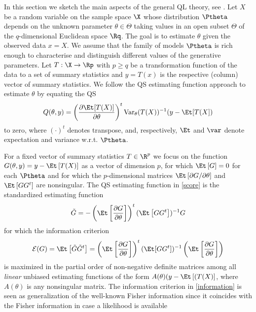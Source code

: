 In this section we sketch the main aspects of the general QL theory, see
\cite{ref:Heyde1997}. Let $X$ be a random variable on the sample space $\X$ whose
distribution $\Ptheta$ depends on the unknown parameter $\theta\in\Theta$ taking values
in an open subset $\Theta$ of the $q$-dimensional Euclidean space $\Rq$.
The goal is to estimate $\theta$ given the observed data $x=X$. We
assume that the family of models $\Ptheta$ is rich enough to characterise and distinguish
different values of the generative parameters. Let $T : \X\rightarrow \Rp$ with $p\geq q$ be a
transformation function of the data to a set of summary statistics and $y = T(x)$ is the respective
(column) vector of summary statistics. We follow the QS estimating function
approach to estimate $\theta$ by equating the QS
\begin{equation}\label{score}
  Q(\theta,y)=\left( \frac{\partial\Et[T(X)]}{\partial\theta} \right)^t \mathrm{Var}_{\theta}(T(X))^{-1}(y-\Et[T(X])
\end{equation}
to zero, where $(\cdot)^t$ denotes transpose, and, respectively, $\Et$ and
$\var$ denote expectation and variance w.r.t. $\Ptheta$.\par
%
For a fixed vector of summary statistics $T\in\R^p$ we focus on the function
$G(\theta,y)=y-\Et\left[T(X)\right]$ as a vector of dimension $p$, for which
$\Et\left[G\right]=0$ for each $\Ptheta$ and for which
the $p$-dimensional matrices $\Et\left[\partial G/\partial\theta\right]$
and $\Et\left[GG^t\right]$ are nonsingular.
The QS estimating function in \eqref{score} is the standardized estimating
function
\begin{equation}
 \tilde{G} = -\left(\Et\left[\frac{\partial G}{\partial \theta}\right]\right)^t (\Et\left[GG^t\right])^{-1}G
\end{equation}
for which the information criterion
\begin{equation}\label{information}
\mathcal{E}(G) = \Et\left[\tilde{G}\tilde{G}^t\right] = \left( \Et\left[\frac{\partial G}{\partial \theta}\right]\right)^t (\Et[GG^t])^{-1}
\left(\Et\left[\frac{\partial G}{\partial \theta}\right]\right)
\end{equation}
is maximized in the partial order of non-negative definite matrices among all
\emph{linear} unbiased estimating functions
of the form $A(\theta)(y-\Et\left[(T(X)\right]$, where $A(\theta)$ is any
nonsingular matrix. The information criterion in \eqref{information} is seen as generalization of the
well-known Fisher information since it coincides with the Fisher information in case a likelihood is available

